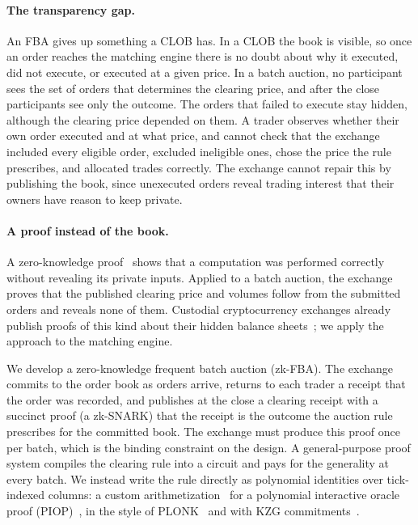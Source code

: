 \paragraph{The transparency gap.}
An FBA gives up something a CLOB has. In a CLOB the book is visible, so once an order reaches the matching engine there is no doubt about why it executed, did not execute, or executed at a given price. In a batch auction, no participant sees the set of orders that determines the clearing price, and after the close participants see only the outcome. The orders that failed to execute stay hidden, although the clearing price depended on them. A trader observes whether their own order executed and at what price, and cannot check that the exchange included every eligible order, excluded ineligible ones, chose the price the rule prescribes, and allocated trades correctly. The exchange cannot repair this by publishing the book, since unexecuted orders reveal trading interest that their owners have reason to keep private.

\paragraph{A proof instead of the book.}
A zero-knowledge proof~\cite{gmw1986} shows that a computation was performed correctly without revealing its private inputs. Applied to a batch auction, the exchange proves that the published clearing price and volumes follow from the submitted orders and reveals none of them. Custodial cryptocurrency exchanges already publish proofs of this kind about their hidden balance sheets~\cite{provisions2015}; we apply the approach to the matching engine.

We develop a zero-knowledge frequent batch auction (zk-FBA). The exchange commits to the order book as orders arrive, returns to each trader a receipt that the order was recorded, and publishes at the close a clearing receipt with a succinct proof (a zk-SNARK) that the receipt is the outcome the auction rule prescribes for the committed book. The exchange must produce this proof once per batch, which is the binding constraint on the design. A general-purpose proof system compiles the clearing rule into a circuit and pays for the generality at every batch. We instead write the rule directly as polynomial identities over tick-indexed columns: a custom arithmetization~\cite{plonkbook} for a polynomial interactive oracle proof (PIOP)~\cite{dark2020}, in the style of PLONK~\cite{plonk2019} and with KZG commitments~\cite{kzg2010}.

